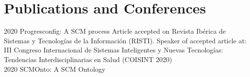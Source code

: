 \documentclass[american]{cv-class}
\begin{document}
\section{Publications and Conferences}
\begin{entrylist}
	\entry
	{2020}
	{Progresconfig: A SCM process}
	{ }
	{Article accepted on Revista Ibérica de Sistemas y Tecnologías de la Información (RISTI). Speaker of accepted article at: III Congreso Internacional de Sistemas Inteligentes y Nuevas Tecnologías: Tendencias Interdisciplinarias en Salud (COISINT 2020) \\
	{\href{https://bit.ly/3eUN9Ly}{}}
	}
	\entry
	{2020}
	{SCMOnto: A SCM Ontology}
	{ }

\end{entrylist}
\end{document}
